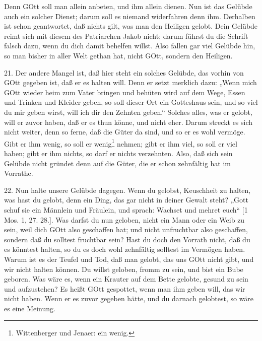 Denn GOtt soll man allein anbeten, und ihm allein dienen. Nun ist das Gelübde auch ein solcher Dienst; darum soll es niemand widerfahren denn ihm. Derhalben ist schon geantwortet, daß nichts gilt, was man den Heiligen gelobt. Dein Gelübde reimt sich mit diesem des Patriarchen Jakob nicht; darum führst du die Schrift falsch dazu, wenn du dich damit behelfen willst. Also fallen gar viel Gelübde hin, so man bisher in aller Welt gethan hat, nicht GOtt, sondern den Heiligen.

21. Der andere Mangel ist, daß hier steht ein solches Gelübde, das vorhin von GOtt gegeben ist, daß er es halten will. Denn er setzt merklich dazu: „Wenn mich GOtt wieder heim zum Vater bringen und behüten wird auf dem Wege, Essen und Trinken und Kleider geben, so soll dieser Ort ein Gotteshaus sein, und so viel du mir geben wirst, will ich dir den Zehnten geben.“ Solches alles, was er gelobt, will er zuvor haben, daß er es thun könne, und nicht eher. Darum streckt es sich nicht weiter, denn so ferne, daß die Güter da sind, und so er es wohl vermöge. Gibt er ihm wenig, so soll er wenig\footnote{Wittenberger und Jenaer: ein wenig.} nehmen; gibt er ihm viel, so soll er viel haben; gibt er ihm nichts, so darf er nichts verzehnten. Also, daß sich sein Gelübde nicht gründet denn auf die Güter, die er schon zehnfältig hat im Vorrathe.

22. Nun halte unsere Gelübde dagegen. Wenn du gelobst, Keuschheit zu halten, was hast du gelobt, denn ein Ding, das gar nicht in deiner Gewalt steht? „Gott schuf sie ein Männlein und Fräulein, und sprach: Wachset und mehret euch“ [1 Mos. 1, 27. 28.]. Was darfst du nun geloben, nicht ein Mann oder ein Weib zu sein, weil dich GOtt also geschaffen hat; und nicht unfruchtbar also geschaffen, sondern daß du solltest fruchtbar sein? Hast du doch den Vorrath nicht, daß du es könntest halten, so du es doch wohl zehnfältig solltest im Vermögen haben. Warum ist es der Teufel und Tod, daß man gelobt, das uns GOtt nicht gibt, und wir nicht halten können. Du willst geloben, fromm zu sein, und bist ein Bube geboren. Was wäre es, wenn ein Krauter auf dem Bette gelobte, gesund zu sein und aufzustehen? Es heißt GOtt gespottet, wenn man ihm geben will, das wir nicht haben. Wenn er es zuvor gegeben hätte, und du darnach gelobtest, so wäre es eine Meinung.

